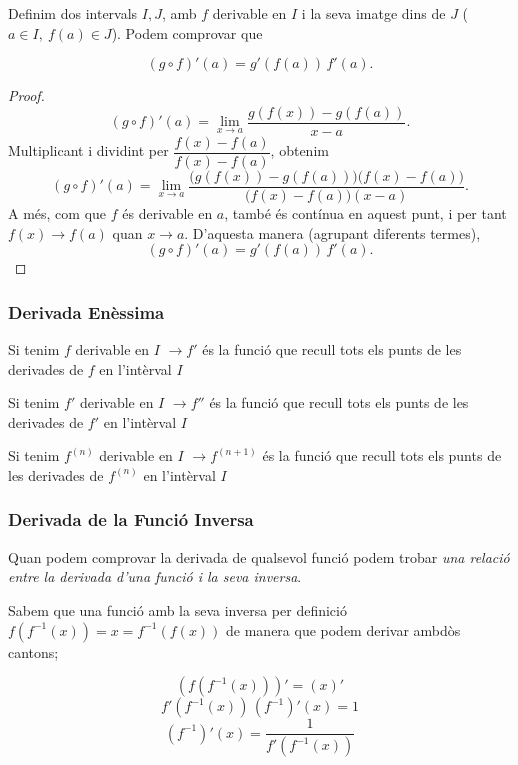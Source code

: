 \documentclass[12pt]{article}
\begin{document}
\begin{itemize}
    Definim dos intervals $I, J$, amb $f$ derivable en $I$ i la seva imatge dins de $J$ ($a \in I,\ f(a)\in J$). Podem comprovar que
    
    \[
        (g\circ f)'(a) = g'(f(a))\,f'(a).
    \]

    \begin{proof}
        \[
            (g\circ f)'(a)
            = \lim_{x\to a}\frac{g(f(x)) - g(f(a))}{x-a}.
        \]
        Multiplicant i dividint per $\dfrac{f(x)-f(a)}{f(x)-f(a)}$, obtenim
        \[
            (g\circ f)'(a)
            = \lim_{x\to a}
              \frac{\bigl(g(f(x)) - g(f(a))\bigr)\bigl(f(x)-f(a)\bigr)}{\bigl(f(x)-f(a)\bigr)(x-a)}.
        \]
        A més, com que $f$ és derivable en $a$, també és contínua en aquest punt, i per tant $f(x)\to f(a)$ quan $x\to a$. D'aquesta manera (agrupant diferents termes),
        \[
            (g\circ f)'(a)=g'(f(a))\,f'(a).
        \]
    \end{proof}
\end{itemize}

\subsubsection{Derivada Enèssima}

Si tenim $f$ derivable en $I$ $\rightarrow $$f'$ és la funció que recull tots els punts de les derivades de $f$ en l'intèrval $I$

Si tenim $f'$ derivable en $I$ $\rightarrow $$f''$ és la funció que recull tots els punts de les derivades de $f'$ en l'intèrval $I$

Si tenim $f^{(n)}$ derivable en $I$ $\rightarrow $$f^{(n+1)}$ és la funció que recull tots els punts de les derivades de $f^{(n)}$ en l'intèrval $I$


\subsubsection{Derivada de la Funció Inversa}

Quan podem comprovar la derivada de qualsevol funció podem trobar \textit{una relació entre la derivada d'una funció i la seva inversa}.

Sabem que una funció amb la seva inversa per definició $f(f^{-1}(x)) = x = f^{-1}(f(x))$ de manera que podem derivar ambdòs cantons;

\[(f(f^{-1}(x)))' = (x)'\]
\[f'(f^{-1}(x))\,(f^{-1})'(x) = 1\]
\[\boxed{(f^{-1})'(x) = \frac{1}{f'(f^{-1}(x))}}\]
\end{document}
